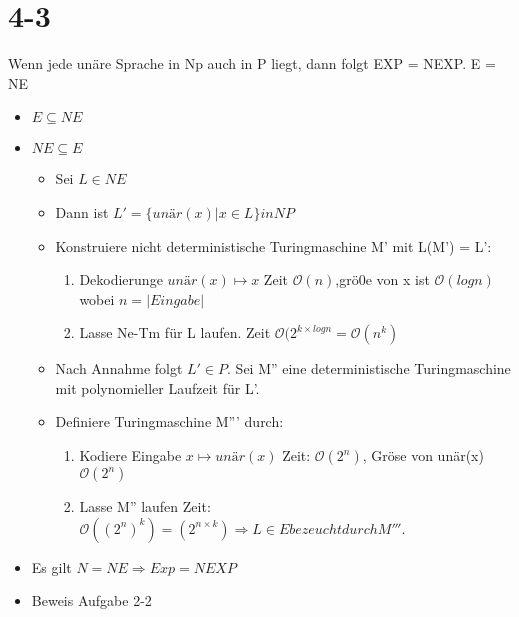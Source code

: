 \documentclass[12pt, oneside, a4paper, numbers=enddot, abstracton, parskip=full]{scrreprt}
\newcommand{\bigO}{\ensuremath{\mathcal{O}}}
\begin{document}
\section{4-3}
Wenn jede unäre Sprache in Np auch in P liegt, dann folgt EXP =
NEXP. E = NE

\begin{itemize}
\item $E\subseteq NE$
\item $NE \subseteq E$
  \begin{itemize}
  \item Sei $L \in NE$
  \item Dann ist $L' =\{unär(x) | x\in L\} in NP $
  \item Konstruiere nicht deterministische Turingmaschine M' mit L(M') = L':
  \begin{enumerate}
  \item Dekodierunge $unär(x) \mapsto x $ Zeit $\bigO (n)$,grö0e von x
    ist $ \bigO (log n) $ wobei $ n=|Eingabe|$
  \item Lasse Ne-Tm  für L laufen. Zeit $ \bigO (2^{k \times log n} = \bigO (n^k)$
    
  \end{enumerate}
  \item Nach Annahme folgt $L' \in P$. Sei M'' eine deterministische
    Turingmaschine mit polynomieller Laufzeit für L'.
  \item Definiere Turingmaschine M''' durch:
    \begin{enumerate}
    \item Kodiere Eingabe $x \mapsto unär(x)$  Zeit: $ \bigO (2^n)$,
      Gröse von unär(x) $ \bigO (2^n)$
    \item Lasse M'' laufen Zeit: $ \bigO ((2^n)^k) = (2^{n \times k})
      \Rightarrow L \in E bezeucht durch M'''.$
    \end{enumerate}
  \end{itemize}
\item Es gilt $N=NE \Rightarrow Exp = NEXP$
\item Beweis Aufgabe 2-2
\end{itemize}
\end{document}
